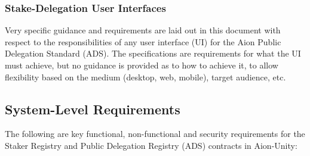 \subsubsection{Stake-Delegation User Interfaces}
Very specific guidance and requirements are laid out in this document with respect to the responsibilities of any user interface (UI) for the Aion Public Delegation Standard (ADS). The specifications are requirements for what the UI must achieve, but no guidance is provided as to how to achieve it, to allow flexibility based on the medium (desktop, web, mobile), target audience, etc. 

\subsection{System-Level Requirements}

The following are key functional, non-functional and security requirements for the Staker Registry and Public Delegation Registry (ADS) contracts in Aion-Unity:

